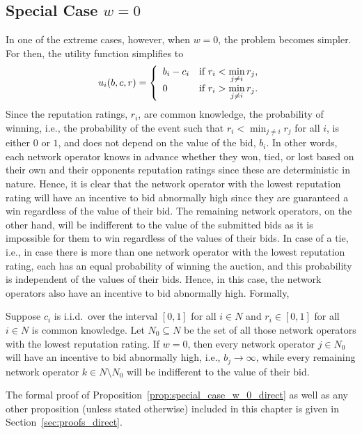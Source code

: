 \subsection{Special Case $w=0$} %
\label{sub:special_case_w_0_direct}
In one of the extreme cases, however, when $w=0$, the problem becomes simpler. For then, the utility function simplifies to
\begin{equation}
	\label{eq:utility_w_0_direct}
	u_i(b,c,r) = \left\{
	\begin{array}{l l}
		b_i-c_i &\text{if } r_i < \displaystyle\min_{j\neq i} r_j,\\
		0 &\text{if } r_i > \displaystyle\min_{j\neq i} r_j.
	\end{array}\right.
\end{equation}
Since the reputation ratings, $r_i$, are common knowledge, the probability of winning, i.e., the probability of the event such that $r_i<\min_{j\neq i}r_j$ for all $i$, is either $0$ or $1$, and does not depend on the value of the bid, $b_i$. In other words, each network operator knows in advance whether they won, tied, or lost based on their own and their opponents reputation ratings since these are deterministic in nature. Hence, it is clear that the network operator with the lowest reputation rating will have an incentive to bid abnormally high since they are guaranteed a win regardless of the value of their bid. The remaining network operators, on the other hand, will be indifferent to the value of the submitted bids as it is impossible for them to win regardless of the values of their bids. In case of a tie, i.e., in case there is more than one network operator with the lowest reputation rating, each has an equal probability of winning the auction, and this probability is independent of the values of their bids. Hence, in this case, the network operators also have an incentive to bid abnormally high. Formally,
\begin{proposition}
\label{prop:special_case_w_0_direct}
Suppose $c_i$ is i.i.d.~over the interval $[0,1]$ for all $i\in N$ and $r_i\in [0,1]$ for all $i\in N$ is common knowledge. Let $N_0\subseteq N$ be the set of all those network operators with the lowest reputation rating. If $w=0$, then every network operator $j\in N_0$ will have an incentive to bid abnormally high, i.e., $b_j\rightarrow\infty$, while every remaining network operator $k\in N\setminus N_0$ will be indifferent to the value of their bid.
\end{proposition}
\noindent The formal proof of Proposition~\ref{prop:special_case_w_0_direct} as well as any other proposition (unless stated otherwise) included in this chapter is given in Section~\ref{sec:proofs_direct}.

